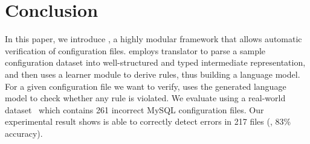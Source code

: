 
\section{Conclusion}

In this paper, we introduce \app, a highly modular framework 
that allows automatic verification of configuration files.
\app employs translator to parse a sample configuration dataset
into well-structured and typed intermediate representation,
and then uses a learner module to derive rules, 
thus building a language model.
For a given configuration file we want to verify,
\app uses the generated language model to check
whether any rule is violated.
We evaluate \app using a real-world dataset~\cite{configdataset}
which contains 261 incorrect MySQL configuration files.
Our experimental result shows \app is able to
correctly detect errors in 217 files (\ie, 83\% accuracy).

